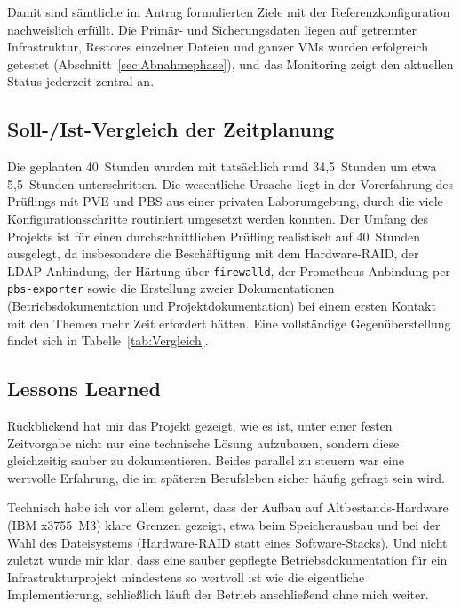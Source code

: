 Damit sind sämtliche im Antrag formulierten Ziele mit der
Referenzkonfiguration nachweislich erfüllt. Die Primär- und
Sicherungsdaten liegen auf getrennter Infrastruktur, Restores
einzelner Dateien und ganzer \acp{VM} wurden erfolgreich
getestet (Abschnitt~\ref{sec:Abnahmephase}), und das
Monitoring zeigt den aktuellen Status jederzeit zentral an.

\subsection{Soll-/Ist-Vergleich der Zeitplanung}
\label{sec:SollIstVergleich}

Die geplanten 40~Stunden wurden mit tatsächlich rund
34{,}5~Stunden um etwa 5{,}5~Stunden unterschritten. Die
wesentliche Ursache liegt in der Vorerfahrung des Prüflings mit
\ac{PVE} und \ac{PBS} aus einer privaten Laborumgebung, durch die
viele Konfigurationsschritte routiniert umgesetzt werden konnten.
Der Umfang des Projekts ist für einen durchschnittlichen Prüfling
realistisch auf 40~Stunden ausgelegt, da insbesondere die
Beschäftigung mit dem Hardware-\ac{RAID}, der LDAP-Anbindung, der
Härtung über \texttt{firewalld}, der Prometheus-Anbindung per
\texttt{pbs-exporter} sowie die Erstellung zweier Dokumentationen
(Betriebsdokumentation und Projektdokumentation) bei einem
ersten Kontakt mit den Themen mehr Zeit erfordert hätten.
Eine vollständige Gegenüberstellung findet sich in
Tabelle~\ref{tab:Vergleich}.

\subsection{Lessons Learned}
\label{sec:LessonsLearned}

Rückblickend hat mir das Projekt gezeigt, wie es ist, unter einer
festen Zeitvorgabe nicht nur eine technische Lösung aufzubauen,
sondern diese gleichzeitig sauber zu dokumentieren. Beides parallel
zu steuern war eine wertvolle Erfahrung, die im späteren Berufsleben
sicher häufig gefragt sein wird.

Technisch habe ich vor allem gelernt, dass der Aufbau auf
Altbestands-Hardware (IBM x3755~M3) klare Grenzen gezeigt, etwa
beim Speicherausbau und bei der Wahl des Dateisystems
(Hardware-\ac{RAID} statt eines Software-Stacks). Und nicht zuletzt
wurde mir klar, dass eine sauber gepflegte Betriebsdokumentation
für ein Infrastrukturprojekt mindestens so wertvoll ist wie die
eigentliche Implementierung, schließlich läuft der Betrieb
anschließend ohne mich weiter.

